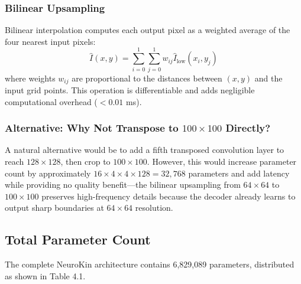 \documentclass[12pt,a4paper,oneside]{report}
\begin{document}
\subsubsection{Bilinear Upsampling}

Bilinear interpolation computes each output pixel as a weighted average of the four nearest input pixels:
\begin{equation}
\hat{I}(x,y) = \sum_{i=0}^{1}\sum_{j=0}^{1} w_{ij} \hat{I}_{\text{low}}(x_i, y_j)
\end{equation}
where weights $w_{ij}$ are proportional to the distances between $(x,y)$ and the input grid points. This operation is differentiable and adds negligible computational overhead ($<0.01$ ms).

\subsubsection{Alternative: Why Not Transpose to $100 \times 100$ Directly?}

A natural alternative would be to add a fifth transposed convolution layer to reach $128 \times 128$, then crop to $100 \times 100$. However, this would increase parameter count by approximately $16 \times 4 \times 4 \times 128 = 32,768$ parameters and add latency while providing no quality benefit---the bilinear upsampling from $64 \times 64$ to $100 \times 100$ preserves high-frequency details because the decoder already learns to output sharp boundaries at $64 \times 64$ resolution.

\subsection{Total Parameter Count}

The complete NeuroKin architecture contains 6,829,089 parameters, distributed as shown in Table 4.1.
\end{document}
